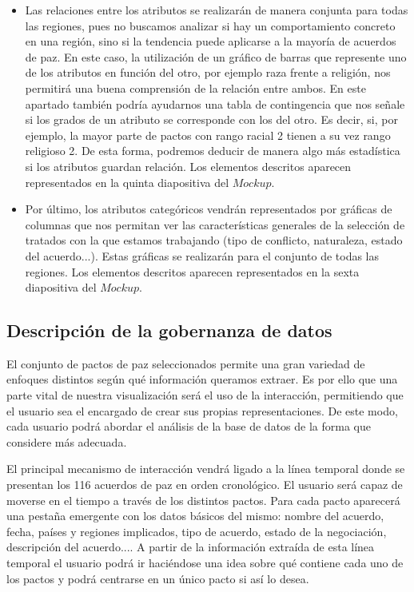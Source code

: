 \documentclass[11pt]{article}
\begin{document}
\begin{itemize}
    \item Las relaciones entre los atributos se realizarán de manera conjunta para todas las regiones, pues no buscamos analizar si hay un comportamiento concreto en una región, sino si la tendencia puede aplicarse a la mayoría de acuerdos de paz. En este caso, la utilización de un gráfico de barras que represente uno de los atributos en función del otro, por ejemplo raza frente a religión, nos permitirá una buena comprensión de la relación entre ambos. En este apartado también podría ayudarnos una tabla de contingencia que nos señale si los grados de un atributo se corresponde con los del otro. Es decir, si, por ejemplo, la mayor parte de pactos con rango racial 2 tienen a su vez rango religioso 2. De esta forma, podremos deducir de manera algo más estadística si los atributos guardan relación. Los elementos descritos aparecen representados en la quinta diapositiva del $\textit{Mockup}$.
    
    \item Por último, los atributos categóricos vendrán representados por gráficas de columnas que nos permitan ver las características generales de la selección de tratados con la que estamos trabajando (tipo de conflicto, naturaleza, estado del acuerdo...). Estas gráficas se realizarán para el conjunto de todas las regiones. Los elementos descritos aparecen representados en la sexta diapositiva del $\textit{Mockup}$.
\end{itemize}

\subsection{Descripción de la gobernanza de datos}\label{gob}

El conjunto de pactos de paz seleccionados permite una gran variedad de enfoques distintos según qué información queramos extraer. Es por ello que una parte vital de nuestra visualización será el uso de la interacción, permitiendo que el usuario sea el encargado de crear sus propias representaciones. De este modo, cada usuario podrá abordar el análisis de la base de datos de la forma que considere más adecuada.

El principal mecanismo de interacción vendrá ligado a la línea temporal donde se presentan los 116 acuerdos de paz en orden cronológico. El usuario será capaz de moverse en el tiempo a través de los distintos pactos. Para cada pacto aparecerá una pestaña emergente con los datos básicos del mismo: nombre del acuerdo, fecha, países y regiones implicados, tipo de acuerdo, estado de la negociación, descripción del acuerdo.... A partir de la información extraída de esta línea temporal el usuario podrá ir haciéndose una idea sobre qué contiene cada uno de los pactos y podrá centrarse en un único pacto si así lo desea.
\end{document}
